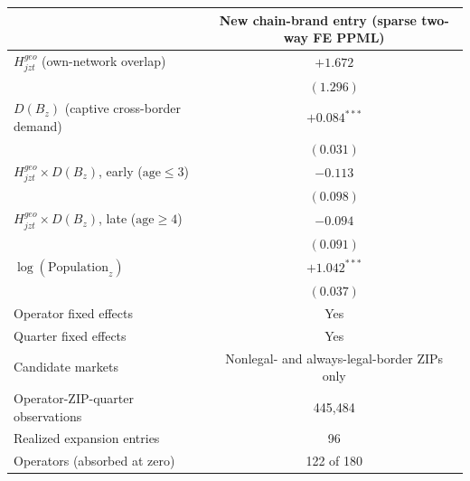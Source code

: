 \begin{tabular}{@{}lc@{}}
\toprule
& New chain-brand entry (sparse two-way FE PPML) \\
\midrule
$H^{geo}_{jzt}$ (own-network overlap) & $+1.672$ \\
 & $(1.296)$ \\
$D(B_z)$ (captive cross-border demand) & $+0.084^{***}$ \\
 & $(0.031)$ \\
$H^{geo}_{jzt}\times D(B_z)$, early ($\text{age}\le3$) & $-0.113$ \\
 & $(0.098)$ \\
$H^{geo}_{jzt}\times D(B_z)$, late ($\text{age}\ge4$) & $-0.094$ \\
 & $(0.091)$ \\
$\log(\text{Population}_z)$ & $+1.042^{***}$ \\
 & $(0.037)$ \\
\midrule
Operator fixed effects & Yes \\
Quarter fixed effects & Yes \\
Candidate markets & Nonlegal- and always-legal-border ZIPs only \\
Operator-ZIP-quarter observations & 445{,}484 \\
Realized expansion entries & 96 \\
Operators (absorbed at zero) & 122 of 180 \\
\bottomrule
\end{tabular}

